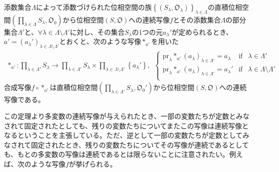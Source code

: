 \documentclass[dvipdfmx]{jsarticle}
\begin{document}
\begin{thm}\label{8.1.4.25}
添数集合$\varLambda$によって添数づけられた位相空間の族$\left\{ \left( S_{\lambda},\mathfrak{O}_{\lambda} \right) \right\}_{\lambda \in \varLambda}$の直積位相空間$\left( \prod_{\lambda \in \varLambda} S_{\lambda},\mathfrak{O}_{0} \right)$から位相空間$\left( S,\mathfrak{O} \right)$への連続写像$f$とその添数集合$\varLambda$の部分集合$\varLambda'$と、$\forall\lambda \in \varLambda \setminus \varLambda'$に対し、その集合$S_{\lambda}$の1つの元$a_{\lambda}'$が定められるとき、$a' = \left( a_{\lambda}' \right)_{\lambda \in \varLambda \setminus \varLambda'}$とおくと、次のような写像$*_{a'}$を用いた
\begin{align*}
*_{a'}:\prod_{\lambda \in \varLambda'} S_{\lambda} \rightarrow \prod_{\lambda \in \varLambda'} S_{\lambda} \times \prod_{\lambda \in \varLambda \setminus \varLambda'} \left\{ a_{\lambda}' \right\},\ \ \left\{ \begin{matrix}
{\mathrm{pr}}_{\lambda}{*_{a'}\left( a_{\lambda} \right)_{\lambda \in \varLambda'}} = a_{\lambda} & \mathrm{if} & \lambda \in \varLambda' \\
{\mathrm{pr}}_{\lambda}{*_{a'}\left( a_{\lambda} \right)_{\lambda \in \varLambda'}} = a_{\lambda}' & \mathrm{if} & \lambda \in \varLambda \setminus \varLambda' \\
\end{matrix} \right.\ 
\end{align*}
合成写像$f \circ *_{a'}$は直積位相空間$\left( \prod_{\lambda \in \varLambda'} S_{\lambda},\mathfrak{O}_{0}' \right)$から位相空間$\left( S,\mathfrak{O} \right)$への連続写像である。
\begin{center}
\end{center}
\end{thm}\par
この定理より多変数の連続写像が与えられたとき、一部の変数たちが定数とみなされて固定されたとしても、残りの変数たちについてまたこの写像は連続写像となるということを主張している。ただ、逆として一部の変数たちが定数としてみなされて固定されたとき、残りの変数たちについてその写像が連続であるとしても、もとの多変数の写像は連続であるとは限らないことに注意されたい。例えば、次のような写像$f$が挙げられる。
\end{document}
